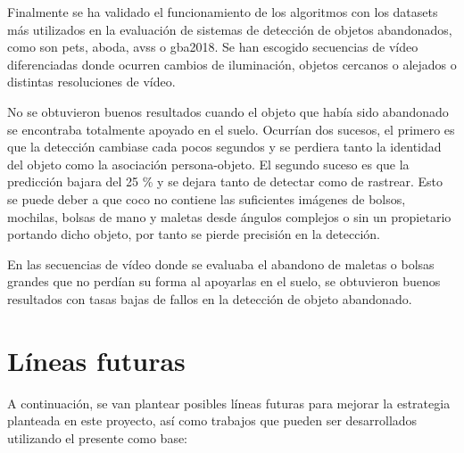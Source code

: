 Finalmente se ha validado el funcionamiento de los algoritmos con los datasets más utilizados en la evaluación de sistemas de detección de objetos abandonados, como son \gls{pets}, \gls{aboda}, \gls{avss} o \gls{gba2018}. Se han escogido secuencias de vídeo diferenciadas donde ocurren cambios de iluminación, objetos cercanos o alejados o distintas resoluciones de vídeo.

No se obtuvieron buenos resultados cuando el objeto que había sido abandonado se encontraba totalmente apoyado en el suelo. Ocurrían dos sucesos, el primero es que la detección cambiase cada pocos segundos y se perdiera tanto la identidad del objeto como la asociación persona-objeto. El segundo suceso es que la predicción bajara del 25 \% y se dejara tanto de detectar como de rastrear. Esto se puede deber a que \gls{coco} no contiene las suficientes imágenes de bolsos, mochilas, bolsas de mano y maletas desde ángulos complejos o sin un propietario portando dicho objeto, por tanto se pierde precisión en la detección.

En las secuencias de vídeo donde se evaluaba el abandono de maletas o bolsas grandes que no perdían su forma al apoyarlas en el suelo, se obtuvieron buenos resultados con tasas bajas de fallos en la detección de objeto abandonado.

\section{Líneas futuras}
\label{sec:lineas-futuras}

A continuación, se van plantear posibles líneas futuras para mejorar la estrategia planteada en este proyecto, así como trabajos que pueden ser desarrollados utilizando el presente como base: 

